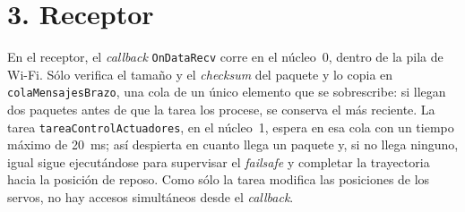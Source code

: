 \documentclass[11pt,a4paper]{article}
\begin{document}
\section*{3. Receptor}

En el receptor, el \emph{callback} \texttt{OnDataRecv} corre en el núcleo~0, dentro de la pila de Wi-Fi. Sólo verifica el tamaño y el \emph{checksum} del paquete y lo copia en \texttt{colaMensajesBrazo}, una cola de un único elemento que se sobrescribe: si llegan dos paquetes antes de que la tarea los procese, se conserva el más reciente. La tarea \texttt{tareaControlActuadores}, en el núcleo~1, espera en esa cola con un tiempo máximo de \SI{20}{ms}; así despierta en cuanto llega un paquete y, si no llega ninguno, igual sigue ejecutándose para supervisar el \emph{failsafe} y completar la trayectoria hacia la posición de reposo. Como sólo la tarea modifica las posiciones de los servos, no hay accesos simultáneos desde el \emph{callback}.
\end{document}
